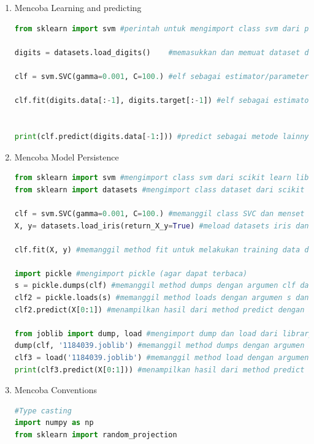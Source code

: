 \begin{enumerate}
\begin{lstlisting}[language=Python]
digits.images[0] #Data selalu berupa array 2D, shape (n.samples, n.features), meskipun data aslinya mungkin memiliki bentuk yang berbeda.
\end{lstlisting}
\item Mencoba Learning and predicting
\begin{lstlisting}[language=Python]
from sklearn import svm #perintah untuk mengimport class svm dari package sklearn

digits = datasets.load_digits()    #memasukkan dan memuat dataset digits ke variabel digits

clf = svm.SVC(gamma=0.001, C=100.) #elf sebagai estimator/parameter, svm.SVC sebagai class, gamma sebagai parameter untuk menerapkan nilai secara manual

clf.fit(digits.data[:-1], digits.target[:-1]) #elf sebagai estimator/parameter, fit sebagai metode, digits.data sebagai item,[:-1] sebagai syntax python dan menampilkan outputnya


print(clf.predict(digits.data[-1:])) #predict sebagai metode lainnya, digit.data sebagai item menampilkan outputnya
\end{lstlisting}
\item Mencoba Model Persistence
\begin{lstlisting}[language=Python]
from sklearn import svm #mengimport class svm dari scikit learn library
from sklearn import datasets #mengimport class dataset dari scikit learn library
 
clf = svm.SVC(gamma=0.001, C=100.) #memanggil class SVC dan menset argument constructor SVC serta ditampung di variabel clf
X, y= datasets.load_iris(return_X_y=True) #meload datasets iris dan ditampung di variabel x untuk data sedangkan y untuk target

clf.fit(X, y) #memanggil method fit untuk melakukan training data dengan argumen data dan target dari database iris 

import pickle #mengimport pickle (agar dapat terbaca)
s = pickle.dumps(clf) #memanggil method dumps dengan argumen clf dan ditampung pada valiabel s
clf2 = pickle.loads(s) #memanggil method loads dengan argumen s dan ditampung di variabel clf2
clf2.predict(X[0:1]) #menampilkan hasil dari method predict dengan argumen data variabel x 

from joblib import dump, load #mengimport dump dan load dari library joblib
dump(clf, '1184039.joblib') #memanggil method dumps dengan argumen clf dari nama file joblib
clf3 = load('1184039.joblib') #memanggil method load dengan argumen nama file joblibnya
print(clf3.predict(X[0:1])) #menampilkan hasil dari method predict dengan argumen data variabel
\end{lstlisting}
\item Mencoba Conventions
\begin{lstlisting}[language=Python]
#Type casting
import numpy as np
from sklearn import random_projection


\end{lstlisting}
\end{enumerate}
